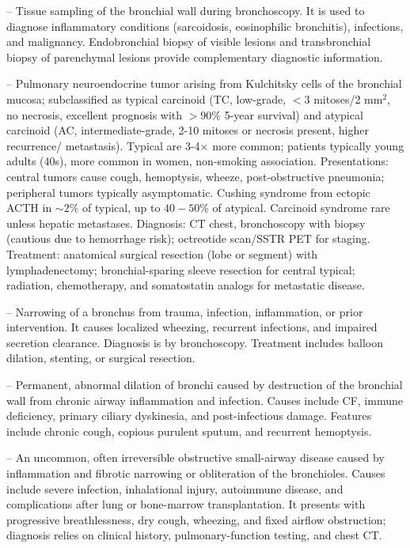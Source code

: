 -- Tissue sampling of the bronchial wall during bronchoscopy. It is used to diagnose inflammatory conditions (sarcoidosis, eosinophilic bronchitis), infections, and malignancy. Endobronchial biopsy of visible lesions and transbronchial biopsy of parenchymal lesions provide complementary diagnostic information.

-- Pulmonary neuroendocrine tumor arising from Kulchitsky cells of the bronchial mucosa; subclassified as typical carcinoid (TC, low-grade, $< 3$ mitoses/2 mm$^2$, no necrosis, excellent prognosis with $> 90\%$ 5-year survival) and atypical carcinoid (AC, intermediate-grade, 2-10 mitoses or necrosis present, higher recurrence/ metastasis). Typical are 3-4$\times$ more common; patients typically young adults (40s), more common in women, non-smoking association. Presentations: central tumors cause cough, hemoptysis, wheeze, post-obstructive pneumonia; peripheral tumors typically asymptomatic. Cushing syndrome from ectopic ACTH in $\sim 2\%$ of typical, up to $40-50\%$ of atypical. Carcinoid syndrome rare unless hepatic metastases. Diagnosis: CT chest, bronchoscopy with biopsy (cautious due to hemorrhage risk); octreotide scan/SSTR PET for staging. Treatment: anatomical surgical resection (lobe or segment) with lymphadenectomy; bronchial-sparing sleeve resection for central typical; radiation, chemotherapy, and somatostatin analogs for metastatic disease.

-- Narrowing of a bronchus from trauma, infection, inflammation, or prior intervention. It causes localized wheezing, recurrent infections, and impaired secretion clearance. Diagnosis is by bronchoscopy. Treatment includes balloon dilation, stenting, or surgical resection.

-- Permanent, abnormal dilation of bronchi caused by destruction of the bronchial wall from chronic airway inflammation and infection. Causes include CF, immune deficiency, primary ciliary dyskinesia, and post-infectious damage. Features include chronic cough, copious purulent sputum, and recurrent hemoptysis.

-- An uncommon, often irreversible obstructive small-airway disease caused by inflammation and fibrotic narrowing or obliteration of the bronchioles. Causes include severe infection, inhalational injury, autoimmune disease, and complications after lung or bone-marrow transplantation. It presents with progressive breathlessness, dry cough, wheezing, and fixed airflow obstruction; diagnosis relies on clinical history, pulmonary-function testing, and chest CT.

